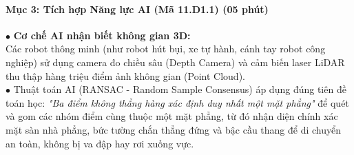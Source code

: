 \documentclass[12pt, a4paper]{article}
\begin{document}
\paragraph{Mục 3: Tích hợp Năng lực AI (Mã 11.D1.1) (05 phút)}

\begin{aibox}
    $\bullet$ \textbf{Cơ chế AI nhận biết không gian 3D:}\\
    Các robot thông minh (như robot hút bụi, xe tự hành, cánh tay robot công nghiệp) sử dụng camera đo chiều sâu (Depth Camera) và cảm biến laser LiDAR thu thập hàng triệu điểm ảnh không gian (Point Cloud).\\
    $\bullet$ Thuật toán AI (RANSAC - Random Sample Consensus) áp dụng đúng tiên đề toán học: \textit{"Ba điểm không thẳng hàng xác định duy nhất một mặt phẳng"} để quét và gom các nhóm điểm cùng thuộc một mặt phẳng, từ đó nhận diện chính xác mặt sàn nhà phẳng, bức tường chắn thẳng đứng và bậc cầu thang để di chuyển an toàn, không bị va đập hay rơi xuống vực.
\end{aibox}
\end{document}
